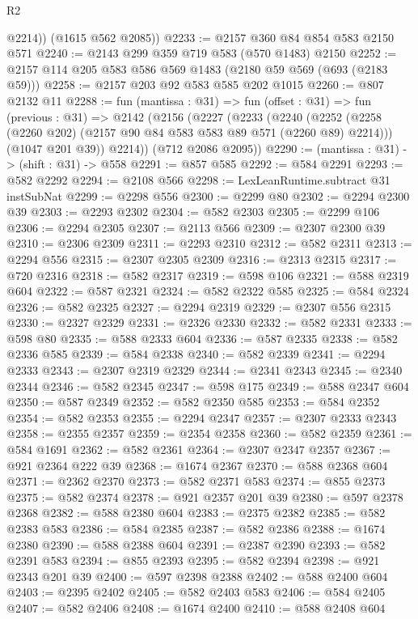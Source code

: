 \begin{lexlean}{R2}
\begin{coremodule}
          @2214))
      (@1615 @562 @2085))
@2233 := @2157 @360 @84 @854 @583 @2150 @571
@2240 := @2143 @299 @359 @719 @583 (@570 @1483) @2150
@2252 := @2157 @114 @205 @583 @586 @569 @1483 (@2180 @59 @569 (@693 (@2183 @59)))
@2258 := @2157 @203 @92 @583 @585 @202 @1015
@2260 := @807 @2132 @11
@2288 := fun (mantissa : @31) =>
  fun (offset : @31) =>
  fun (previous : @31) =>
  @2142
    (@2156
      (@2227
        (@2233
          (@2240
            (@2252 (@2258 (@2260 @202) (@2157 @90 @84 @583 @583 @89 @571 (@2260 @89) @2214)))
            (@1047 @201 @39))
          @2214))
      (@712 @2086 @2095))
@2290 := (mantissa : @31) -> (shift : @31) -> @558
@2291 := @857 @585
@2292 := @584 @2291
@2293 := @582 @2292
@2294 := @2108 @566
@2298 := LexLeanRuntime.subtract @31 instSubNat
@2299 := @2298 @556
@2300 := @2299 @80
@2302 := @2294 @2300 @39
@2303 := @2293 @2302
@2304 := @582 @2303
@2305 := @2299 @106
@2306 := @2294 @2305
@2307 := @2113 @566
@2309 := @2307 @2300 @39
@2310 := @2306 @2309
@2311 := @2293 @2310
@2312 := @582 @2311
@2313 := @2294 @556
@2315 := @2307 @2305 @2309
@2316 := @2313 @2315
@2317 := @720 @2316
@2318 := @582 @2317
@2319 := @598 @106
@2321 := @588 @2319 @604
@2322 := @587 @2321
@2324 := @582 @2322 @585
@2325 := @584 @2324
@2326 := @582 @2325
@2327 := @2294 @2319
@2329 := @2307 @556 @2315
@2330 := @2327 @2329
@2331 := @2326 @2330
@2332 := @582 @2331
@2333 := @598 @80
@2335 := @588 @2333 @604
@2336 := @587 @2335
@2338 := @582 @2336 @585
@2339 := @584 @2338
@2340 := @582 @2339
@2341 := @2294 @2333
@2343 := @2307 @2319 @2329
@2344 := @2341 @2343
@2345 := @2340 @2344
@2346 := @582 @2345
@2347 := @598 @175
@2349 := @588 @2347 @604
@2350 := @587 @2349
@2352 := @582 @2350 @585
@2353 := @584 @2352
@2354 := @582 @2353
@2355 := @2294 @2347
@2357 := @2307 @2333 @2343
@2358 := @2355 @2357
@2359 := @2354 @2358
@2360 := @582 @2359
@2361 := @584 @1691
@2362 := @582 @2361
@2364 := @2307 @2347 @2357
@2367 := @921 @2364 @222 @39
@2368 := @1674 @2367
@2370 := @588 @2368 @604
@2371 := @2362 @2370
@2373 := @582 @2371 @583
@2374 := @855 @2373
@2375 := @582 @2374
@2378 := @921 @2357 @201 @39
@2380 := @597 @2378 @2368
@2382 := @588 @2380 @604
@2383 := @2375 @2382
@2385 := @582 @2383 @583
@2386 := @584 @2385
@2387 := @582 @2386
@2388 := @1674 @2380
@2390 := @588 @2388 @604
@2391 := @2387 @2390
@2393 := @582 @2391 @583
@2394 := @855 @2393
@2395 := @582 @2394
@2398 := @921 @2343 @201 @39
@2400 := @597 @2398 @2388
@2402 := @588 @2400 @604
@2403 := @2395 @2402
@2405 := @582 @2403 @583
@2406 := @584 @2405
@2407 := @582 @2406
@2408 := @1674 @2400
@2410 := @588 @2408 @604

\end{coremodule}
\end{lexlean}
